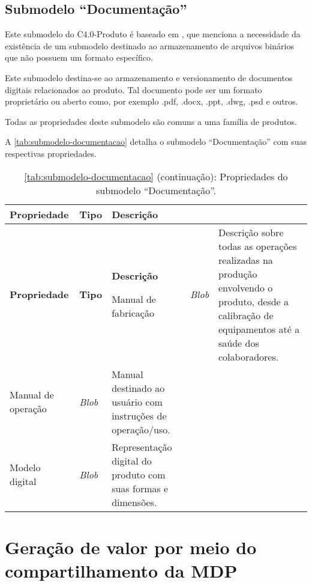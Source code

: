 \subsection{Submodelo ``Documentação''}

Este submodelo do C4.0-Produto é baseado em , que menciona a necessidade da existência de um submodelo destinado ao armazenamento de arquivos binários que não possuem um formato específico.

Este submodelo destina-se ao armazenamento e versionamento de documentos digitais relacionados ao produto. Tal documento pode ser um formato proprietário ou aberto como, por exemplo .pdf, .docx, .ppt, .dwg, .psd e outros.

Todas as propriedades deste submodelo são comuns a uma família de produtos.

A \autoref{tab:submodelo-documentacao} detalha o submodelo ``Documentação'' com suas respectivas propriedades.

\begin{longtable}{|p{}|p{}|p{}|}

	\caption{\label{tab:submodelo-documentacao} Propriedades do submodelo ``Documentação''.}
	\\ \hline \textbf{Propriedade} & \textbf{Tipo} & \textbf{Descrição}
	\endfirsthead

	\caption*{\autoref{tab:submodelo-documentacao} (continuação): Propriedades do submodelo ``Documentação''.}
	\\ \hline \textbf{Propriedade} & \textbf{Tipo} & \textbf{Descrição}
	\endhead

	\hline Manual de fabricação & \textit{Blob} & Descrição sobre todas as operações realizadas na produção envolvendo o produto, desde a calibração de equipamentos até a saúde dos colaboradores.

	\\ \hline Manual de operação & \textit{Blob} & Manual destinado ao usuário com instruções de operação/uso.

	\\ \hline Modelo digital & \textit{Blob} & Representação digital do produto com suas formas e dimensões.

	\\ \hline
\end{longtable}

\section{Geração de valor por meio do compartilhamento da MDP}
\label{sec:geracao-de-valor}


